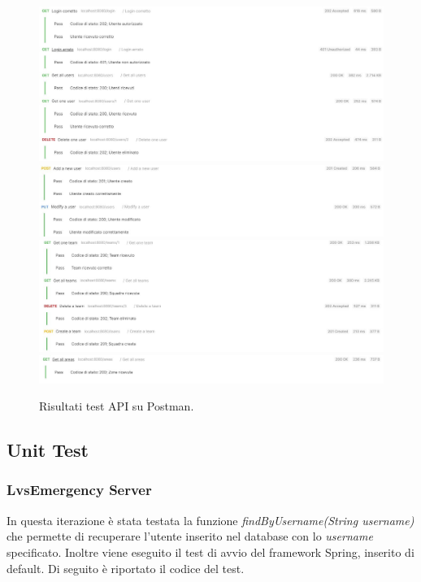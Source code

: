 \begin{itemize}
	\begin{figure}[h!]
		\centering
		\includegraphics[width=0.99\linewidth]{./Iterazione 2/ImageFiles/TestUserController1}
		\includegraphics[width=0.99\linewidth]{./Iterazione 2/ImageFiles/TestUserController2}
		\includegraphics[width=1\linewidth]{./Iterazione 2/ImageFiles/TestTeamController}
		\includegraphics[width=1\linewidth]{./Iterazione 2/ImageFiles/TestAreaController}
		\caption{Risultati test API su Postman.}
		\label{fig:RisultatiTestAPIIT2}
	\end{figure}
\end{itemize}

\clearpage

\subsection{Unit Test}
\subsubsection{LvsEmergency Server}
In questa iterazione è stata testata la funzione \textit{findByUsername(String username)} che permette di recuperare l'utente inserito nel database con lo \textit{username} specificato. Inoltre viene eseguito il test di avvio del framework Spring, inserito di default. Di seguito è riportato il codice del test.

